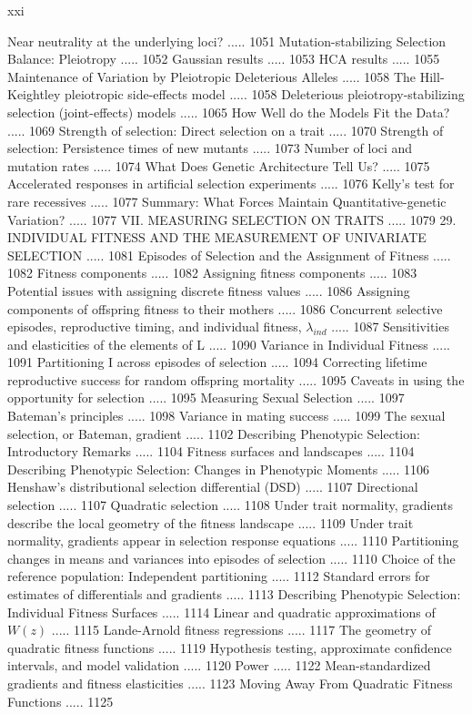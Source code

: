 \documentclass{article}
\begin{document}
xxi

Near neutrality at the underlying loci? ..... 1051
Mutation-stabilizing Selection Balance: Pleiotropy ..... 1052
Gaussian results ..... 1053
HCA results ..... 1055
Maintenance of Variation by Pleiotropic Deleterious Alleles ..... 1058
The Hill-Keightley pleiotropic side-effects model ..... 1058
Deleterious pleiotropy-stabilizing selection (joint-effects) models ..... 1065
How Well do the Models Fit the Data? ..... 1069
Strength of selection: Direct selection on a trait ..... 1070
Strength of selection: Persistence times of new mutants ..... 1073
Number of loci and mutation rates ..... 1074
What Does Genetic Architecture Tell Us? ..... 1075
Accelerated responses in artificial selection experiments ..... 1076
Kelly's test for rare recessives ..... 1077
Summary: What Forces Maintain Quantitative-genetic Variation? ..... 1077
VII. MEASURING SELECTION ON TRAITS ..... 1079
29. INDIVIDUAL FITNESS AND THE MEASUREMENT OF UNIVARIATE SELECTION ..... 1081
Episodes of Selection and the Assignment of Fitness ..... 1082
Fitness components ..... 1082
Assigning fitness components ..... 1083
Potential issues with assigning discrete fitness values ..... 1086
Assigning components of offspring fitness to their mothers ..... 1086
Concurrent selective episodes, reproductive timing, and individual fitness,  $ \lambda_{ind} $ ..... 1087
Sensitivities and elasticities of the elements of L ..... 1090
Variance in Individual Fitness ..... 1091
Partitioning I across episodes of selection ..... 1094
Correcting lifetime reproductive success for random offspring mortality ..... 1095
Caveats in using the opportunity for selection ..... 1095
Measuring Sexual Selection ..... 1097
Bateman's principles ..... 1098
Variance in mating success ..... 1099
The sexual selection, or Bateman, gradient ..... 1102
Describing Phenotypic Selection: Introductory Remarks ..... 1104
Fitness surfaces and landscapes ..... 1104
Describing Phenotypic Selection: Changes in Phenotypic Moments ..... 1106
Henshaw's distributional selection differential (DSD) ..... 1107
Directional selection ..... 1107
Quadratic selection ..... 1108
Under trait normality, gradients describe the local geometry of the fitness landscape ..... 1109
Under trait normality, gradients appear in selection response equations ..... 1110
Partitioning changes in means and variances into episodes of selection ..... 1110
Choice of the reference population: Independent partitioning ..... 1112
Standard errors for estimates of differentials and gradients ..... 1113
Describing Phenotypic Selection: Individual Fitness Surfaces ..... 1114
Linear and quadratic approximations of  $ W(z) $ ..... 1115
Lande-Arnold fitness regressions ..... 1117
The geometry of quadratic fitness functions ..... 1119
Hypothesis testing, approximate confidence intervals, and model validation ..... 1120
Power ..... 1122
Mean-standardized gradients and fitness elasticities ..... 1123
Moving Away From Quadratic Fitness Functions ..... 1125
\end{document}
